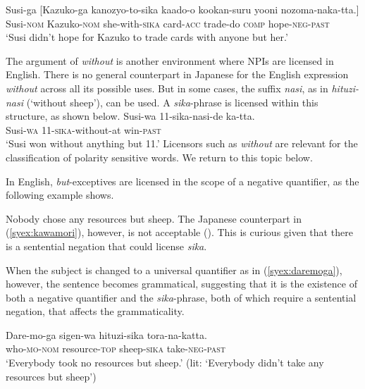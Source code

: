\documentclass[output=paper]{langscibook}
\begin{document}
\ea \gll Susi-ga [Kazuko-ga kanozyo-to-sika kaado-o kookan-suru yooni nozoma-naka-tta.]\\
Susi-\textsc{nom} Kazuko-\textsc{nom} she-with-\textsc{sika} card-\textsc{acc} trade-do \textsc{comp} hope-\textsc{neg}-\textsc{past}\\
\glt `Susi didn't hope for Kazuko to trade cards with anyone but her.'\z


The argument of \emph{without} is another environment where NPIs are licensed in English.
There is no general counterpart in Japanese for the English expression \textit{without} across all its possible uses.  But in some cases, the suffix \emph{nasi}, as in \emph{hituzi-nasi} (`without sheep'), can be used. A \emph{sika}-phrase is licensed within this structure, as shown below.
\ea \label{syex:nasi}
    \gll Susi-wa 11-sika-nasi-de ka-tta.\\
        Susi-\textsc{wa} 11-\textsc{sika}-without-at  win-\textsc{past}\\
    \glt    `Susi won without anything but 11.'\z
%       
Licensors such as \emph{without} are relevant for the classification of polarity sensitive words.  We return to this topic below.

In English, \emph{but}-exceptives are licensed in the scope of a negative quantifier, as the following example shows. 

\ea Nobody chose any resources but sheep.\z
%
The Japanese counterpart in (\ref{syex:kawamori}), however, is not acceptable (\citealt{kawamori01a}). This is curious given that there is a sentential negation that could license \emph{sika}. 

\z

When the subject is changed to a universal quantifier as in (\ref{syex:daremoga}), however, the sentence becomes grammatical, suggesting that it is the existence of both a negative quantifier and the \emph{sika}-phrase, both of which require a sentential negation, that affects the grammaticality.

\ea \label{syex:daremoga}
\gll Dare-mo-ga sigen-wa hituzi-sika tora-na-katta.\\
who-\textsc{mo}-\textsc{nom} resource-\textsc{top} sheep-\textsc{sika} take-\textsc{neg-past}\\
\glt `Everybody took no resources but sheep.' (lit: `Everybody didn't take any resources but sheep')\z
\end{document}
